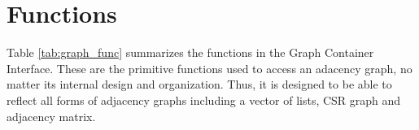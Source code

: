 \section{Functions}


Table \ref{tab:graph_func} summarizes the functions in the Graph Container Interface. These are the primitive functions used to access an adacency graph, no matter its internal design and organization. Thus, it is designed to be able to reflect all forms of adjacency graphs including a vector of lists, CSR graph and adjacency matrix.


